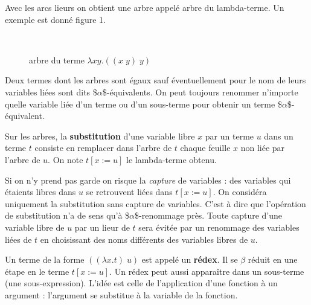 \documentclass[11pt, a4paper]{article}
\begin{document}
\begin{multicols}{2}
Avec les arcs lieurs on obtient une arbre appelé arbre du
lambda-terme. Un exemple est donné figure 1.

\begin{wrapfigure}{r}{0.2\textwidth}
\vspace{-0.7cm}~\hspace{-0.5cm}
\vspace{-0.5cm}
\label{fig:as}
\caption{arbre du terme $\lambda xy. ((x\; y)\; y)$}
\end{wrapfigure}

Deux termes dont les arbres sont égaux sauf éventuellement pour le nom
de leurs variables liées sont dits \$\(\alpha\)\$-équivalents. On peut
toujours renommer n'importe quelle variable liée d'un terme ou d'un
sous-terme pour obtenir un terme \$\(\alpha\)\$-équivalent.

Sur les arbres, la \textbf{substitution} d'une variable libre \(x\) par un terme
\(u\) dans un terme \(t\) consiste en remplacer dans l'arbre de \(t\) chaque
feuille \(x\) non liée par l'arbre de \(u\). On note \(t[x:=u]\) le
lambda-terme obtenu.

Si on n'y prend pas garde on risque la \emph{capture} de variables : des
variables qui étaients libres dans \(u\) se retrouvent liées dans
\(t[x:=u]\). On considéra uniquement la substitution sans capture de
variables. C'est à dire que l'opération de substitution n'a de sens qu'à
\$\(\alpha\)\$-renommage près. Toute capture d'une variable
libre de \(u\) par un lieur de \(t\) sera évitée par un renommage des
variables liées de \(t\) en choisissant des noms différents des
variables libres de \(u\).

Un terme de la forme \(((\lambda x. t)\; u)\) est appelé un \textbf{rédex}. Il
se \(\beta\) réduit en une étape en le terme \(t[x:=u]\). Un rédex peut
aussi apparaître dans un sous-terme (une sous-expression). L'idée est
celle de l'application d'une fonction à un argument : l'argument se
substitue à la variable de la fonction.


\end{multicols}
\end{document}
